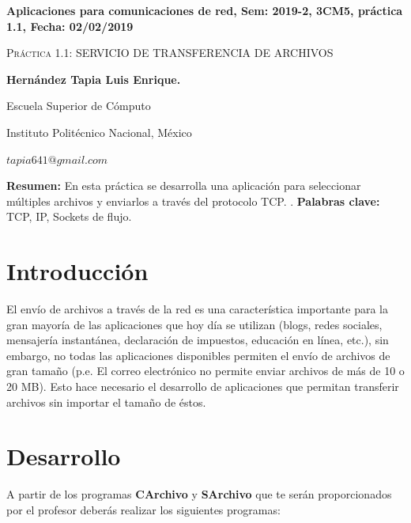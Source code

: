 \documentclass[12pt,twoside]{article}
\date{}
\begin{document}
\centerline{\bf Aplicaciones para comunicaciones de red, Sem: 2019-2, 3CM5, pr\'actica 1.1, Fecha: 02/02/2019}
\centerline{}
\centerline{}
\begin{center}
\Large{\textsc{Pr\'actica 1.1: SERVICIO DE TRANSFERENCIA DE ARCHIVOS}}
\end{center}
\centerline{}
\centerline{\bf {Hern\'andez Tapia Luis Enrique.}}
\centerline{}
\centerline{Escuela Superior de C\'omputo}
\centerline{Instituto Polit\'ecnico Nacional, M\'exico}
\centerline{$tapia641@gmail.com$}
\newtheorem{Theorem}{\quad Theorem}[section]
\newtheorem{Definition}[Theorem]{\quad Definition}
\newtheorem{Corollary}[Theorem]{\quad Corollary}
\newtheorem{Lemma}[Theorem]{\quad Lemma}
\newtheorem{Example}[Theorem]{\quad Example}
\bigskip

\textbf{Resumen:} En esta pr\'actica se desarrolla una aplicaci\'on para seleccionar m\'ultiples archivos y enviarlos a trav\'es del protocolo TCP. \newline.
\textbf{\newline Palabras clave:} TCP, IP, Sockets de flujo.



\section{Introducci\'on}

El env\'io de archivos a trav\'es de la red es una caracter\'istica importante para la gran mayor\'ia de las aplicaciones que hoy d\'ia se utilizan (blogs, redes sociales, mensajer\'ia instant\'anea, declaraci\'on de impuestos, educaci\'on en l\'inea, etc.), sin embargo, no todas las aplicaciones disponibles permiten el env\'io de archivos de gran tama\~no (p.e. El correo electr\'onico no permite enviar archivos de m\'as de 10 o 20 MB).
Esto hace necesario el desarrollo de aplicaciones que permitan transferir archivos sin importar el tamaño de \'estos.

\newpage


\section{Desarrollo}

A partir de los programas \textbf{CArchivo} y \textbf{SArchivo} que te ser\'an proporcionados por el profesor deber\'as realizar los siguientes programas: \newline\newline 
\end{document}
